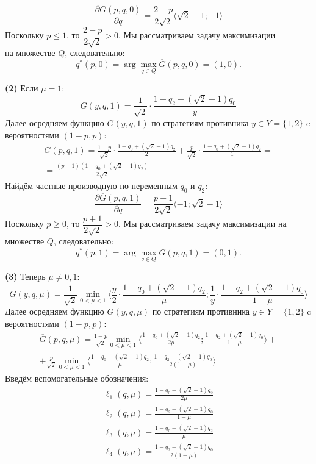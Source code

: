 $$
	\frac{\partial \overline G(p,q,0)}{\partial q}
	=\frac{2-p}{2\sqrt{2}} \langle \sqrt{2}-1;-1\rangle
$$
Поскольку $p \leqslant 1$, то $\dfrac{2-p}{2\sqrt{2}} > 0 $.
Мы рассматриваем задачу максимизации \\ на множестве $Q$, следовательно:
$$
	q^*(p,0) = \arg \max \limits_{q \in Q} \overline G(p,q,0)=(1,0).
$$
	
	
\textbf{(2)}
Если $\mu=1:$
$$
	G(y,q,1)=\frac{1}{\sqrt{2}}\cdot \frac{1-q_2+(\sqrt{2}-1)q_0}{y}
$$	
Далее осредняем функцию $G(y,q,1)$ по стратегиям 
противника $y \in Y=\{1,2\}$ c вероятностями $(1-p,p)$:
\begin{gather*}
	\overline G(p,q,1)=
	\frac{1-p}{\sqrt{2}} \cdot \frac{1-q_0+(\sqrt{2}-1)q_2}{2}+
	\frac{p}{\sqrt{2}} \cdot \frac{1-q_0+(\sqrt{2}-1)q_2}{1}=\\
	=\frac{(p+1)(1-q_0+(\sqrt{2}-1)q_2)}{2\sqrt{2}}
\end{gather*}
Найдём частные производную по переменным $q_0$ и $q_2$:	
$$
	\frac{\partial \overline G(p,q,1)}{\partial q}
	=\frac{p+1}{2\sqrt{2}} \langle -1; \sqrt{2}-1\rangle
$$
Поскольку $p \geqslant 0$, то $\dfrac{p+1}{2\sqrt{2}} > 0 $.
Мы рассматриваем задачу максимизации на множестве $Q$, 
следовательно:
$$
	q^*(p,1) = \arg \max \limits_{q\in Q} \overline G(p,q,1)=(0,1).
$$


\textbf{(3)} 
Теперь $\mu \neq 0,1$:
$$
	G(y,q,\mu)=\frac{1}{\sqrt{2}}\min \limits_{0<\mu<1}
	\big \langle
		\frac{y}{2} \cdot \frac{1-q_0+(\sqrt{2}-1)q_2}{\mu};
		\frac{1}{y} \cdot \frac{1-q_2+(\sqrt{2}-1)q_0}{1-\mu}
	\big \rangle	
$$
Далее осредняем функцию $G(y,q,\mu)$ по стратегиям 
противника $y \in Y=\{1,2\}$ c вероятностями $(1-p,p)$:
\begin{multline}
	\label{eq:G_aver}
	\overline G(p,q,\mu)=\frac{1-p}{\sqrt{2}}\min \limits_{0<\mu<1}
	\big \langle
		\frac{1-q_0+(\sqrt{2}-1)q_2}{2\mu};
		\frac{1-q_2+(\sqrt{2}-1)q_0}{1-\mu}
	\big \rangle + \\
	+\frac{p}{\sqrt{2}}\min \limits_{0<\mu<1}
	\big \langle
		\frac{1-q_0+(\sqrt{2}-1)q_2}{\mu};
		\frac{1-q_2+(\sqrt{2}-1)q_0}{2(1-\mu)}
	\big \rangle 
\end{multline}
Введём вспомогательные обозначения:
\begin{gather*}
	\ell_1(q,\mu)=\frac{1-q_0+(\sqrt{2}-1)q_2}{2\mu} \\
	\ell_2(q,\mu)=\frac{1-q_2+(\sqrt{2}-1)q_0}{1-\mu} \\
	\ell_3(q,\mu)=\frac{1-q_0+(\sqrt{2}-1)q_2}{\mu} \\
	\ell_4(q,\mu)=\frac{1-q_2+(\sqrt{2}-1)q_0}{2(1-\mu)}
\end{gather*}
	
